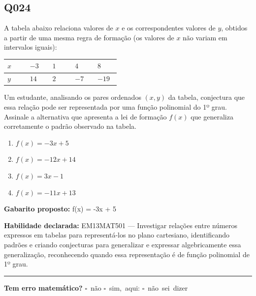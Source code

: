 \documentclass[11pt,a4paper]{article}
\begin{document}
\underline{\hspace{\linewidth}}

\underline{\hspace{\linewidth}}
\vspace{0.6em}

\begin{samepage}
\subsection*{Q024}
A tabela abaixo relaciona valores de $x$ e os correspondentes valores de $y$, obtidos a partir de uma mesma regra de formação (os valores de $x$ não variam em intervalos iguais):

\begin{center}
\begin{tabular}{|p{0.172\linewidth}|p{0.172\linewidth}|p{0.172\linewidth}|p{0.172\linewidth}|p{0.172\linewidth}|}
\hline
\textbf{$x$} & \textbf{$-3$} & \textbf{$1$} & \textbf{$4$} & \textbf{$8$} \\
\hline
$y$ & $14$ & $2$ & $-7$ & $-19$ \\
\hline
\end{tabular}
\end{center}

Um estudante, analisando os pares ordenados $(x,y)$ da tabela, conjectura que essa relação pode ser representada por uma função polinomial do 1º grau. Assinale a alternativa que apresenta a lei de formação $f(x)$ que generaliza corretamente o padrão observado na tabela.
\begin{enumerate}[label=(\alph*),nosep,leftmargin=*]
\item $f(x) = -3x + 5$
\item $f(x) = -12x + 14$
\item $f(x) = 3x - 1$
\item $f(x) = -11x + 13$
\end{enumerate}

\textbf{Gabarito proposto:} f(x) = -3x + 5

\textbf{Habilidade declarada:} EM13MAT501 --- Investigar relações entre números expressos em tabelas para representá-los no plano cartesiano, identificando padrões e criando conjecturas para generalizar e expressar algebricamente essa generalização, reconhecendo quando essa representação é de função polinomial de 1º grau.
\end{samepage}

\noindent\rule{\linewidth}{0.4pt}
\textbf{Tem erro matemático?}\quad
\mbox{$\square$~não} \quad \mbox{$\square$~sim, aqui:} \underline{\hspace{5cm}}
\quad \mbox{$\square$~não sei dizer}
\end{document}
